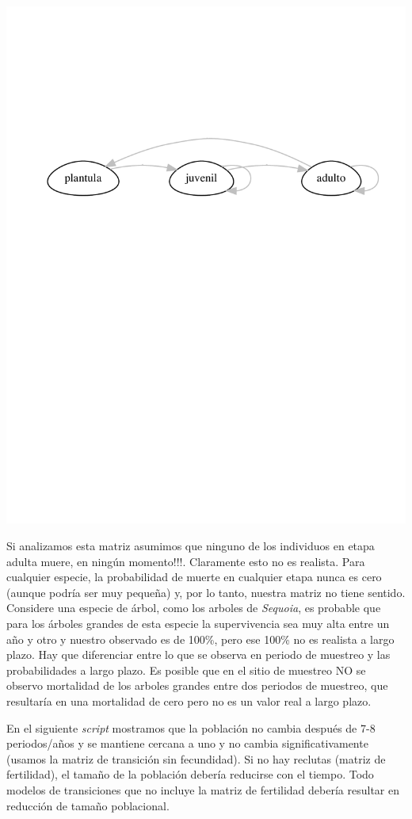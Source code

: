 \documentclass[
]{book}
\theoremstyle{definition}
\theoremstyle{definition}
\theoremstyle{definition}
\theoremstyle{definition}
\theoremstyle{remark}
\begin{document}
\includegraphics{Diagnostico_Poblacional_files/figure-latex/unnamed-chunk-38-1.pdf}

Si analizamos esta matriz asumimos que ninguno de los individuos en etapa adulta muere, en ningún momento!!!. Claramente esto no es realista. Para cualquier especie, la probabilidad de muerte en cualquier etapa nunca es cero (aunque podría ser muy pequeña) y, por lo tanto, nuestra matriz no tiene sentido. Considere una especie de árbol, como los arboles de \emph{Sequoia}, es probable que para los árboles grandes de esta especie la supervivencia sea muy alta entre un año y otro y nuestro observado es de 100\%, pero ese 100\% no es realista a largo plazo. Hay que diferenciar entre lo que se observa en periodo de muestreo y las probabilidades a largo plazo. Es posible que en el sitio de muestreo NO se observo mortalidad de los arboles grandes entre dos periodos de muestreo, que resultaría en una mortalidad de cero pero no es un valor real a largo plazo.

En el siguiente \emph{script} mostramos que la población no cambia después de 7-8 periodos/años y se mantiene cercana a uno y no cambia significativamente (usamos la matriz de transición sin fecundidad). Si no hay reclutas (matriz de fertilidad), el tamaño de la población debería reducirse con el tiempo. Todo modelos de transiciones que no incluye la matriz de fertilidad debería resultar en reducción de tamaño poblacional.
\end{document}
